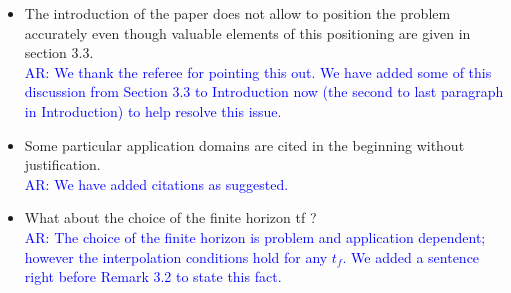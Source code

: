 \documentclass[11pt]{article}
\def\serkan#1{\textcolor{blue}{{#1}}}
\begin{document}
\begin{itemize}
\item The introduction of the paper does not allow to position the problem
accurately even though valuable elements of this positioning are given
in section 3.3. \\ [1ex]
\serkan{\textsf{AR}:  We thank the referee for pointing this out. We have added some of this discussion from Section 3.3 to Introduction now (the second to last paragraph in Introduction) to help resolve this issue.}   

\item Some particular application domains are cited in the beginning without
justification. \\[1ex]
\serkan{\textsf{AR}:  We have added citations as suggested.}  
\item What about the choice of the finite horizon tf ? \\ [1ex]
\serkan{\textsf{AR}: The choice of the finite horizon is  problem and application dependent; however the interpolation conditions hold for any $t_f$. We added a sentence right before Remark 3.2 to state this fact.}


\end{itemize}
\end{document}
